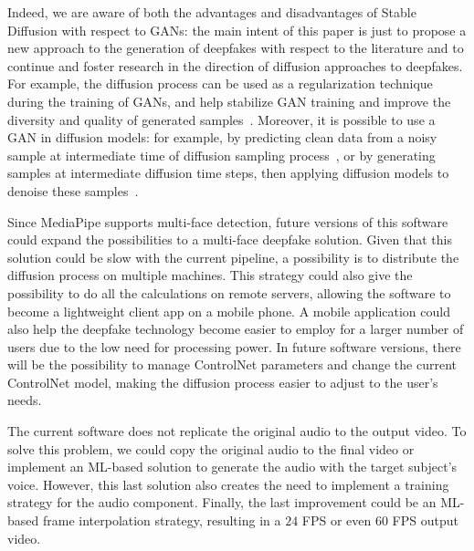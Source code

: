 \documentclass[preprint]{elsarticle}
\begin{document}
Indeed, we are aware of both the advantages and disadvantages of Stable Diffusion with respect to GANs: the main intent of this paper is just to propose a new approach to the generation of deepfakes with respect to the literature and to continue and foster research in the direction of diffusion approaches to deepfakes. For example, the diffusion process can be used as a regularization technique during the training of GANs, and help stabilize GAN training and improve the diversity and quality of generated samples~\cite{mix}.
Moreover, it is possible to use a GAN  in diffusion models: for example, by predicting clean data from a noisy sample at intermediate time of diffusion sampling process~\cite{ganindiff1}, or by generating samples at intermediate diffusion time steps, then applying diffusion models to denoise these samples~\cite{ganindiff2}.


Since MediaPipe supports multi-face detection, future versions of this software could expand the possibilities to a multi-face deepfake solution. Given that this solution could be slow with the current pipeline, a possibility is to distribute the diffusion process on multiple machines. This strategy could also give the possibility to do all the calculations on remote servers, allowing the software to become a lightweight client app on a mobile phone. A mobile application could also help the deepfake technology become easier to employ for a larger number of users due to the low need for processing power. In future software versions, there will be the possibility to manage ControlNet parameters and change the current ControlNet model, making the diffusion process easier to adjust to the user's needs.

The current software does not replicate the original audio to the output video. To solve this problem, we could copy the original audio to the final video or implement an ML-based solution to generate the audio with the target subject's voice. However, this last solution also creates the need to implement a training strategy for the audio component. Finally, the last improvement could be an ML-based frame interpolation strategy, resulting in a $24$ FPS or even $60$ FPS output video.



  

\end{document}

